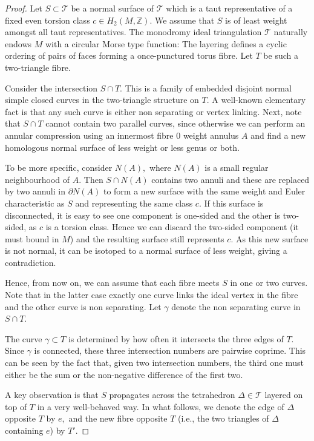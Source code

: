 \documentclass[a4paper]{gtart}
\def\tri{\mathcal{T}}
\def\manifold{M}
\def\Z{\mathbb{Z}}
\theoremstyle{plain}
\theoremstyle{definition}
\theoremstyle{remark}
\numberwithin{equation}{section}
\begin{document}
\begin{proof}
  Let $S \subset \tri$ be a normal surface of $\tri$ which is a taut representative of a fixed even torsion class $c \in H_2 (\manifold , \Z).$ We assume that $S$ is of least weight amongst all taut representatives. The monodromy ideal triangulation $\tri$ naturally endows $\manifold$ with a circular Morse type function: The layering defines a cyclic ordering of pairs of faces forming a once-punctured torus fibre. Let $T$ be such a two-triangle fibre. 

Consider the intersection $S \cap T.$ This is a family of embedded disjoint normal simple closed curves in the two-triangle structure on $T.$ A well-known elementary fact is that any such curve is either non separating or vertex linking. Next, note that $S \cap T$ cannot contain two parallel curves, since otherwise we can perform an annular compression using an innermost fibre $0$ weight annulus $A$ and find a new homologous normal surface of less weight or less genus or both. 

To be more specific, consider $N(A),$ where $N(A)$ is a small regular neighbourhood of $A.$ Then $S \cap N(A)$ contains two annuli and these are replaced by two annuli in $\partial N(A)$ to form a new surface with the same weight and Euler characteristic as $S$  and representing the same class $c.$ If this surface is disconnected, it is easy to see one component is one-sided and the other is two-sided, as $c$ is a torsion class. Hence we can discard the two-sided component (it must bound in $\manifold$) and the resulting surface still represents $c.$ As this new surface is not normal, it can be isotoped to a normal surface of less weight, giving a contradiction. 

Hence, from now on, we can assume that each fibre meets $S$ in one or two curves. Note that in the latter case exactly one curve links the ideal vertex in the fibre and the other curve is non separating. Let $\gamma$ denote the non separating curve in $S \cap T.$

The curve $\gamma \subset T$ is determined by how often it intersects the three edges of $T.$ Since $\gamma$ is connected, these three intersection numbers are pairwise coprime. This can be seen by the fact that, given two intersection numbers, the third one must either be the sum or the non-negative difference of the first two. 

  A key observation is that $S$ propagates across the tetrahedron $\Delta \in \tri$ layered on top of $T$ in a very well-behaved way. In what follows, we denote the edge of $\Delta$ opposite $T$ by $e,$ and the new fibre opposite $T$ (i.e., the two triangles of $\Delta$ containing $e$) by $T'.$


\end{proof}
\end{document}
